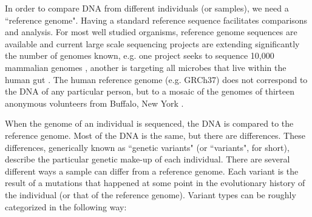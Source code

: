 In order to compare DNA from different individuals (or samples), we need a ``reference genome". 
Having a standard reference sequence facilitates comparisons and analysis. 
For most well studied organisms, reference genome sequences are available and current large scale sequencing projects are extending significantly the number of genomes known, e.g. one project seeks to sequence 10,000 mammalian genomes \cite{haussler2009genome}, another is targeting all microbes that live within the human gut \cite{turnbaugh2007human}. 
The human reference genome (e.g. GRCh37) does not correspond to the DNA of any particular person, but to a mosaic of the genomes of thirteen anonymous volunteers from Buffalo, New York \cite{schneider2013genome}.

When the genome of an individual is sequenced, the DNA is compared to the reference genome. 
Most of the DNA is the same, but there are differences. 
These differences, generically known as ``genetic variants" (or ``variants", for short), describe the particular genetic make-up of each individual. 
There are several different ways a sample can differ from a reference genome. 
Each variant is the result of a mutations that happened at some point in the evolutionary history of the individual (or that of the reference genome). Variant types can be roughly categorized in the following way:

